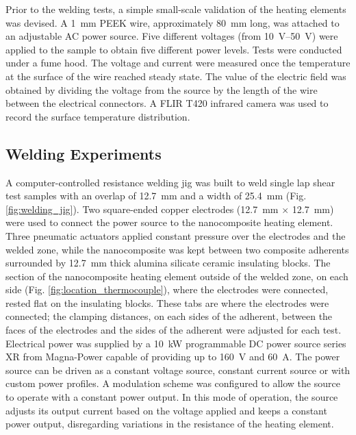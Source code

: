 \documentclass[11pt,review,times]{elsarticle}
\begin{document}
Prior to the welding tests, a simple small-scale validation of the heating elements was devised. 
A \SI{1}{\milli\metre} PEEK wire, approximately \SI{80}{\milli\metre} long, was attached to an adjustable AC power source. 
Five different voltages (from \SIrange{10}{50}{\volt}) were applied to the sample to obtain five different power levels. 
Tests were conducted under a fume hood. 
The voltage and current were measured once the temperature at the surface of the wire reached steady state. 
The value of the electric field was obtained by dividing the voltage from the source by the length of the wire between the electrical connectors. 
A FLIR T420 infrared camera was used to record the surface temperature distribution. 

\subsection{Welding Experiments}

A computer-controlled resistance welding jig was built to weld single lap shear test samples with an overlap of \SI{12.7}{\milli\metre} and a width of \SI{25.4}{\milli\metre} (Fig. \ref{fig:welding_jig}). 
Two square-ended copper electrodes (\SI{12.7}{\milli\metre} $\times$ \SI{12.7}{\milli\metre}) were used to connect the power source to the nanocomposite heating element. 
Three pneumatic actuators applied constant pressure over the electrodes and the welded zone, while the nanocomposite was kept between two composite adherents surrounded by \SI{12.7}{\milli\metre} thick alumina silicate ceramic insulating blocks. 
The section of the nanocomposite heating element outside of the welded zone, on each side (Fig. \ref{fig:location_thermocouple}), where the electrodes were connected, rested flat on the insulating blocks. 
These tabs are where the electrodes were connected; the clamping distances, on each sides of the adherent, between the faces of the electrodes and the sides of the adherent were adjusted for each test. 
Electrical power was supplied by a \SI{10}{\kW} programmable DC power source series XR from Magna-Power capable of providing up to \SI{160}{\volt} and \SI{60}{\ampere}. 
The power source can be driven as a constant voltage source, constant current source or with custom power profiles. 
A modulation scheme was configured to allow the source to operate with a constant power output. 
In this mode of operation, the source adjusts its output current based on the voltage applied and keeps a constant power output, disregarding variations in the resistance of the heating element. 
\end{document}
